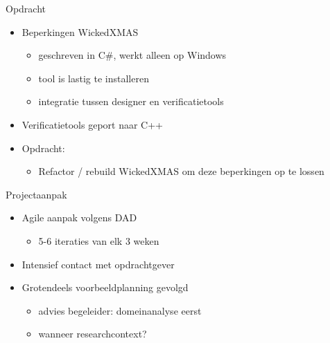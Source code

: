 \documentclass[10pt]{beamer}
\begin{document}
\begin{frame}{Opdracht}

\begin{itemize}
 \item Beperkingen WickedXMAS
 \begin{itemize}
  \item geschreven in C\#, werkt alleen op Windows
  \item tool is lastig te installeren
  \item integratie tussen designer en verificatietools
 \end{itemize}
 
 \item Verificatietools geport naar C++
 
 \item Opdracht:
 \begin{itemize}
  \item Refactor / rebuild WickedXMAS om deze beperkingen op te lossen
 \end{itemize}


\end{itemize}

\end{frame}


\begin{frame}{Projectaanpak}

\begin{itemize}
 \item Agile aanpak volgens DAD
 \begin{itemize}
  \item 5-6 iteraties van elk 3 weken
 \end{itemize}

 \item Intensief contact met opdrachtgever
 \item Grotendeels voorbeeldplanning gevolgd
 \begin{itemize}
  \item advies begeleider: domeinanalyse eerst
  \item wanneer researchcontext?
 \end{itemize}

\end{itemize}

    
\end{frame}
\end{document}
